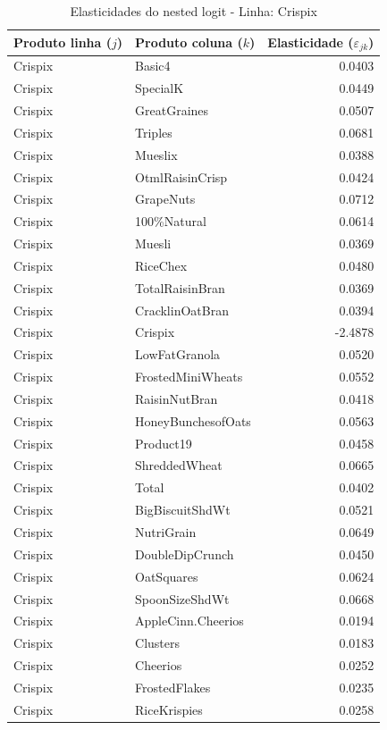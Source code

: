 \begingroup
\begin{table}[H]
\centering
\caption{Elasticidades do nested logit - Linha: Crispix}
\label{tab:elas-nested-crispix}
\small
\begin{tabular}{llr}
\toprule
Produto linha ($j$) & Produto coluna ($k$) & Elasticidade ($\varepsilon_{jk}$) \\
\midrule
Crispix & Basic4 & 0.0403 \\
Crispix & SpecialK & 0.0449 \\
Crispix & GreatGraines & 0.0507 \\
Crispix & Triples & 0.0681 \\
Crispix & Mueslix & 0.0388 \\
Crispix & OtmlRaisinCrisp & 0.0424 \\
Crispix & GrapeNuts & 0.0712 \\
Crispix & 100\%Natural & 0.0614 \\
Crispix & Muesli & 0.0369 \\
Crispix & RiceChex & 0.0480 \\
Crispix & TotalRaisinBran & 0.0369 \\
Crispix & CracklinOatBran & 0.0394 \\
Crispix & Crispix & -2.4878 \\
Crispix & LowFatGranola & 0.0520 \\
Crispix & FrostedMiniWheats & 0.0552 \\
Crispix & RaisinNutBran & 0.0418 \\
Crispix & HoneyBunchesofOats & 0.0563 \\
Crispix & Product19 & 0.0458 \\
Crispix & ShreddedWheat & 0.0665 \\
Crispix & Total & 0.0402 \\
Crispix & BigBiscuitShdWt & 0.0521 \\
Crispix & NutriGrain & 0.0649 \\
Crispix & DoubleDipCrunch & 0.0450 \\
Crispix & OatSquares & 0.0624 \\
Crispix & SpoonSizeShdWt & 0.0668 \\
Crispix & AppleCinn.Cheerios & 0.0194 \\
Crispix & Clusters & 0.0183 \\
Crispix & Cheerios & 0.0252 \\
Crispix & FrostedFlakes & 0.0235 \\
Crispix & RiceKrispies & 0.0258 \\

\end{tabular}
\end{table}
